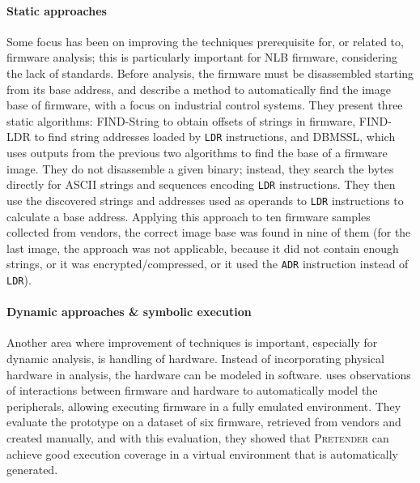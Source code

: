 \paragraph{Static approaches}
Some focus has been on improving the techniques prerequisite for, or related to, firmware analysis; this is particularly important for NLB firmware, considering the lack of standards.
Before analysis, the firmware must be disassembled starting from its base address, and  describe a method to automatically find the image base of firmware, with a focus on industrial control systems.
They present three static algorithms: FIND-String to obtain offsets of strings in firmware, FIND-LDR to find string addresses loaded by \texttt{LDR} instructions, and DBMSSL, which uses outputs from the previous two algorithms to find the base of a firmware image.
They do not disassemble a given binary; instead, they search the bytes directly for ASCII strings and sequences encoding \texttt{LDR} instructions.
They then use the discovered strings and addresses used as operands to \texttt{LDR} instructions to calculate a base address.
Applying this approach to ten firmware samples collected from vendors, the correct image base was found in nine of them (for the last image, the approach was not applicable, because it did not contain enough strings, or it was encrypted/compressed, or it used the \texttt{ADR} instruction instead of \texttt{LDR}).

\paragraph{Dynamic approaches \& symbolic execution}
Another area where improvement of techniques is important, especially for dynamic analysis, is handling of hardware.
Instead of incorporating physical hardware in analysis, the hardware can be modeled in software.
 uses observations of interactions between firmware and hardware to automatically model the peripherals, allowing executing firmware in a fully emulated environment.
They evaluate the prototype on a dataset of six firmware, retrieved from vendors and created manually, and with this evaluation, they showed that \textsc{Pretender} can achieve good execution coverage in a virtual environment that is automatically generated.

